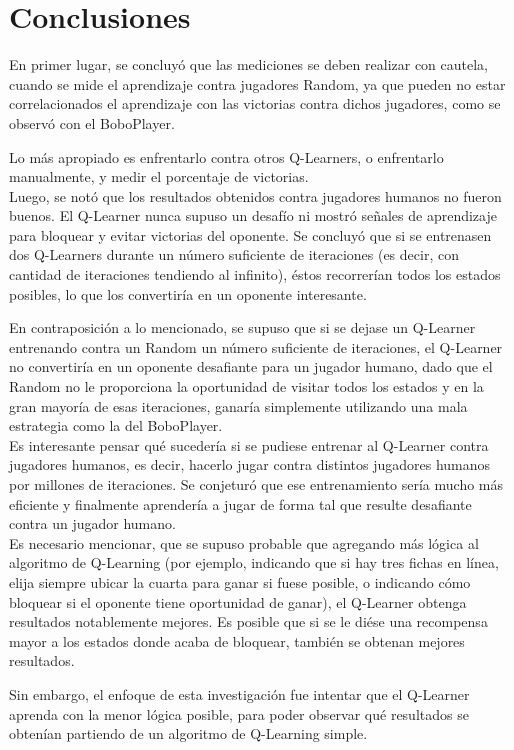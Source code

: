 \section{Conclusiones}
En primer lugar, se concluyó que las mediciones se deben realizar con cautela, cuando se mide el aprendizaje contra jugadores Random, ya que pueden no estar correlacionados el aprendizaje con las victorias contra dichos jugadores, como se observó con el BoboPlayer. 

Lo más apropiado es enfrentarlo contra otros Q-Learners, o enfrentarlo manualmente, y medir el porcentaje de victorias.\\

Luego, se notó que los resultados obtenidos contra jugadores humanos no fueron buenos. El Q-Learner nunca supuso un desafío ni mostró señales de aprendizaje para bloquear y evitar victorias del oponente. Se concluyó que si se entrenasen dos Q-Learners durante un número suficiente de iteraciones (es decir, con cantidad de iteraciones tendiendo al infinito), éstos recorrerían todos los estados posibles, lo que los convertiría en un oponente interesante. 

En contraposición a lo mencionado, se supuso que si se dejase un Q-Learner entrenando contra un Random un número suficiente de iteraciones, el Q-Learner no convertiría en un oponente desafiante para un jugador humano, dado que el Random no le proporciona la oportunidad de visitar todos los estados y en la gran mayoría de esas iteraciones, ganaría simplemente utilizando una mala estrategia como la del BoboPlayer.\\

Es interesante pensar qué sucedería si se pudiese entrenar al Q-Learner contra jugadores humanos, es decir, hacerlo jugar contra distintos jugadores humanos por millones de iteraciones. Se conjeturó que ese entrenamiento sería mucho más eficiente y finalmente aprendería a jugar de forma tal que resulte desafiante contra un jugador humano.\\

Es necesario mencionar, que se supuso probable que agregando más lógica al algoritmo de Q-Learning (por ejemplo, indicando que si hay tres fichas en línea, elija siempre ubicar la cuarta para ganar si fuese posible, o indicando cómo bloquear si el oponente tiene oportunidad de ganar), el Q-Learner obtenga resultados notablemente mejores. Es posible que si se le diése una recompensa mayor a los estados donde acaba de bloquear, también se obtenan mejores resultados. 

Sin embargo, el enfoque de esta investigación fue intentar que el Q-Learner aprenda con la menor lógica posible, para poder observar qué resultados se obtenían partiendo de un algoritmo de Q-Learning simple.
